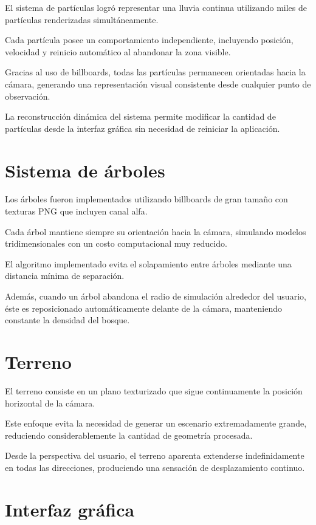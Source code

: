 El sistema de partículas logró representar una lluvia continua utilizando miles de partículas renderizadas simultáneamente.

Cada partícula posee un comportamiento independiente, incluyendo posición, velocidad y reinicio automático al abandonar la zona visible.

Gracias al uso de billboards, todas las partículas permanecen orientadas hacia la cámara, generando una representación visual consistente desde cualquier punto de observación.

La reconstrucción dinámica del sistema permite modificar la cantidad de partículas desde la interfaz gráfica sin necesidad de reiniciar la aplicación.

\section{Sistema de árboles}

Los árboles fueron implementados utilizando billboards de gran tamaño con texturas PNG que incluyen canal alfa.

Cada árbol mantiene siempre su orientación hacia la cámara, simulando modelos tridimensionales con un costo computacional muy reducido.

El algoritmo implementado evita el solapamiento entre árboles mediante una distancia mínima de separación.

Además, cuando un árbol abandona el radio de simulación alrededor del usuario, éste es reposicionado automáticamente delante de la cámara, manteniendo constante la densidad del bosque.

\section{Terreno}

El terreno consiste en un plano texturizado que sigue continuamente la posición horizontal de la cámara.

Este enfoque evita la necesidad de generar un escenario extremadamente grande, reduciendo considerablemente la cantidad de geometría procesada.

Desde la perspectiva del usuario, el terreno aparenta extenderse indefinidamente en todas las direcciones, produciendo una sensación de desplazamiento continuo.

\section{Interfaz gráfica}


